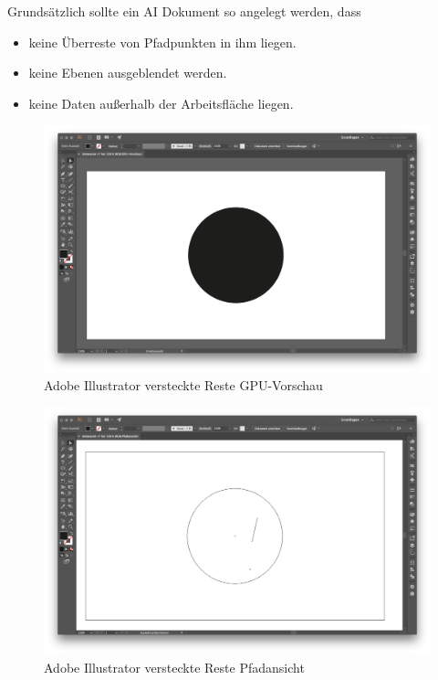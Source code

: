 \documentclass[]{article}
\providecommand{\tightlist}{%
  \setlength{\itemsep}{0pt}\setlength{\parskip}{0pt}}
\begin{document}
Grundsätzlich sollte ein AI Dokument so angelegt werden, dass

\begin{itemize}
\tightlist
\item
  keine Überreste von Pfadpunkten in ihm liegen.
\item
  keine Ebenen ausgeblendet werden.
\item
  keine Daten außerhalb der Arbeitsfläche liegen.
\end{itemize}

\begin{figure}
\hypertarget{fig:reste-gpu}{%
\centering
\includegraphics{assets/images/ai-reste-gpu.png}
\caption{Adobe Illustrator versteckte Reste
GPU-Vorschau}\label{fig:reste-gpu}
}
\end{figure}

\begin{figure}
\hypertarget{fig:reste}{%
\centering
\includegraphics{assets/images/ai-reste.png}
\caption{Adobe Illustrator versteckte Reste
Pfadansicht}\label{fig:reste}
}
\end{figure}
\end{document}
